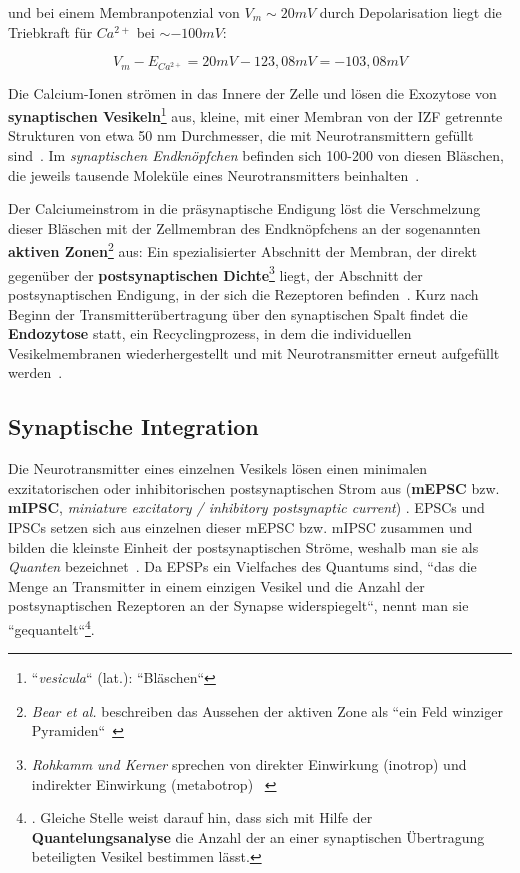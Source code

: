 {{{\pagebreak

und bei einem Membranpotenzial von $V_m \sim 20 mV$ durch Depolarisation liegt die Triebkraft für $Ca^{2+}$ bei $\sim -100 mV$:

\begin{equation}
 V_m - E_{Ca^{2+}} = 20 mV - 123,08 mV = -103,08 mV
 \label{eq:gl-triebkraftca2}
\end{equation}


Die Calcium-Ionen strömen in das Innere der Zelle und lösen die Exozytose von \textbf{synaptischen Vesikeln}\footnote{
 ``\textit{vesicula}`` (lat.): ``Bläschen``
} aus, kleine, mit einer Membran von der IZF getrennte Strukturen von etwa 50 nm Durchmesser, die mit Neurotransmittern gefüllt sind~\cite[1000]{BCP18}.
Im \textit{synaptischen Endknöpfchen} befinden sich 100-200 von diesen Bläschen, die jeweils tausende Moleküle eines Neurotransmitters beinhalten~\cite[184]{KSJ+13}.

Der Calciumeinstrom in die präsynaptische Endigung löst die Verschmelzung dieser Bläschen mit der Zellmembran des Endknöpfchens an der sogenannten \textbf{aktiven Zonen}\footnote{
 \textit{Bear et al.} beschreiben das Aussehen der aktiven Zone als ``ein Feld winziger Pyramiden``~\cite[123]{BCP18}
} aus: Ein spezialisierter Abschnitt der Membran, der direkt gegenüber der \textbf{postsynaptischen Dichte}\footnote{
 \textit{Rohkamm und Kerner} sprechen von direkter Einwirkung (inotrop) und indirekter Einwirkung (metabotrop) ~\cite[134]{RK18}
} liegt, der Abschnitt der postsynaptischen Endigung, in der sich die Rezeptoren befinden~\cite[96]{HS19a}.
Kurz nach Beginn der Transmitterübertragung über den synaptischen Spalt findet die \textbf{Endozytose} statt, ein Recyclingprozess, in dem die individuellen Vesikelmembranen wiederhergestellt und mit Neurotransmitter erneut aufgefüllt werden~\cite[133]{BCP18}.


\subsection{Synaptische Integration}

Die Neurotransmitter eines einzelnen Vesikels lösen einen minimalen exzitatorischen oder inhibitorischen postsynaptischen Strom aus (\textbf{mEPSC} bzw. \textbf{mIPSC}, \textit{miniature excitatory / inhibitory postsynaptic current}) . 
EPSCs und IPSCs setzen sich aus einzelnen dieser mEPSC bzw. mIPSC zusammen und bilden die kleinste Einheit der postsynaptischen Ströme, weshalb man sie als \textit{Quanten} bezeichnet~\cite[98]{HS19a}.
Da EPSPs ein Vielfaches des Quantums sind, ``das die Menge an Transmitter in einem einzigen Vesikel und die Anzahl der postsynaptischen Rezeptoren an der Synapse widerspiegelt``, nennt man sie ``gequantelt``\footnote{
 \cite[142]{BCP18}. Gleiche Stelle weist darauf hin, dass sich mit Hilfe der \textbf{Quantelungsanalyse} die Anzahl der an einer synaptischen Übertragung beteiligten Vesikel bestimmen lässt.
}.

}}}
